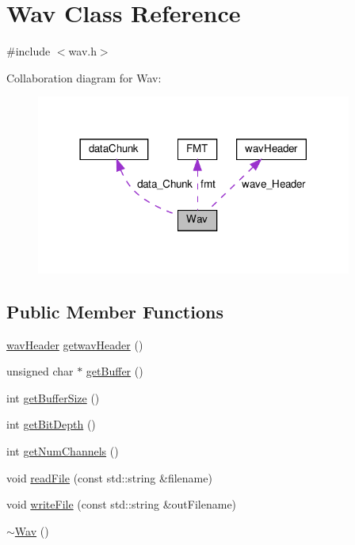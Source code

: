 \hypertarget{classWav}{}\section{Wav Class Reference}
\label{classWav}


{\ttfamily \#include $<$wav.\+h$>$}



Collaboration diagram for Wav\+:\nopagebreak
\begin{figure}[H]
\begin{center}
\leavevmode
\includegraphics[width=294pt]{classWav__coll__graph}
\end{center}
\end{figure}
\subsection*{Public Member Functions}
\begin{DoxyCompactItemize}
\item 
\hyperlink{structwavHeader}{wav\+Header} \hyperlink{classWav_a5e521ff6da3e7a3ed546d948a125847f}{getwav\+Header} ()
\item 
unsigned char $\ast$ \hyperlink{classWav_a2daf07a90ed34789e3a1874973d9bd36}{get\+Buffer} ()
\item 
int \hyperlink{classWav_a11de10cb698ea0ea08f3a28580f21b39}{get\+Buffer\+Size} ()
\item 
int \hyperlink{classWav_afbd5588a3621503ee028fbec055fd075}{get\+Bit\+Depth} ()
\item 
int \hyperlink{classWav_abfc3c1b6afed8bfc43a17cbd76f8a809}{get\+Num\+Channels} ()
\item 
void \hyperlink{classWav_a8dbfa6c6dc4d8a0df92b0e4cb49d0133}{read\+File} (const std\+::string \&filename)
\item 
void \hyperlink{classWav_a3e4d48579d4c83afb0519ac8492af6d0}{write\+File} (const std\+::string \&out\+Filename)
\item 
\hyperlink{classWav_a1510b246ba121b103a60b8e7839af25f}{$\sim$\+Wav} ()
\end{DoxyCompactItemize}
